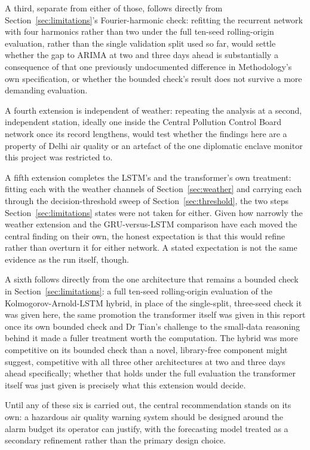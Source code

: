 \documentclass[12pt,a4paper]{report}
\begin{document}
A third, separate from either of those, follows directly from
Section~\ref{sec:limitations}'s Fourier-harmonic check: refitting the
recurrent network with four harmonics rather than two under the full
ten-seed rolling-origin evaluation, rather than the single validation
split used so far, would settle whether the gap to ARIMA at two and three
days ahead is substantially a consequence of that one previously
undocumented difference in Methodology's own specification, or whether
the bounded check's result does not survive a more demanding evaluation.

A fourth extension is independent of weather: repeating the analysis at a
second, independent station, ideally one inside the Central Pollution
Control Board network once its record lengthens, would test whether the
findings here are a property of Delhi air quality or an artefact of the one
diplomatic enclave monitor this project was restricted to.

A fifth extension completes the LSTM's and the transformer's own
treatment: fitting each with the weather channels of
Section~\ref{sec:weather} and carrying each through the decision-threshold
sweep of Section~\ref{sec:threshold}, the two steps
Section~\ref{sec:limitations} states were not taken for either.
Given how narrowly the weather extension and the GRU-versus-LSTM
comparison have each moved the central finding on their own, the honest
expectation is that this would refine rather than overturn it for either
network. A stated expectation is not the same evidence as the run itself,
though.

A sixth follows directly from the one architecture that remains a bounded
check in Section~\ref{sec:limitations}: a full ten-seed rolling-origin
evaluation of the Kolmogorov-Arnold-LSTM hybrid, in place of the
single-split, three-seed check it was given here, the same promotion the
transformer itself was given in this report once its own bounded check
and Dr Tian's challenge to the small-data reasoning behind it made a
fuller treatment worth the computation. The hybrid was more competitive
on its bounded check than a novel, library-free component might suggest,
competitive with all three other architectures at two and three days
ahead specifically; whether that holds under the full evaluation the
transformer itself was just given is precisely what this extension would
decide.

Until any of these six is carried out, the central recommendation stands
on its own: a hazardous air quality warning system should be designed
around the alarm budget its operator can justify, with the forecasting
model treated as a secondary refinement rather than the primary design
choice.
\end{document}
